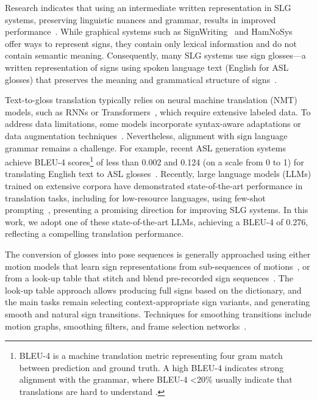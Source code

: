 Research indicates that using an intermediate written representation in SLG systems, preserving linguistic nuances and grammar, results in improved performance~\cite{hwang2024universal, ma2024multi, camgoz_neural_2018}. While graphical systems such as SignWriting~\cite{sutton1974signwriting} and HamNoSys~\cite{hanke2004hamnosys} offer ways to represent signs, they contain only lexical information and do not contain semantic meaning. Consequently, many SLG systems use sign glosses---a written representation of signs using spoken language text (\eg English for ASL glosses) that preserves the meaning and grammatical structure of signs~\cite{liddell2003grammar,desai2024systemic, bragg_sign_2019, muller_considerations_2023}. 

Text-to-gloss translation typically relies on neural machine translation (NMT) models, such as RNNs or Transformers~\cite{stoll_text2sign_2020, stoll2018sign, egea_gomez_syntax-aware_2021, saunders_progressive_2020, walsh_sign_2024, zhu_neural_2023, saunders2022signing}, which require extensive labeled data. To address data limitations, some models incorporate syntax-aware adaptations or data augmentation techniques~\cite{egea_gomez_syntax-aware_2021, zhu_neural_2023}. Nevertheless, alignment with sign language grammar remains a challenge. For example, recent ASL generation systems achieve BLEU-4 scores\footnote{ BLEU-4 is a machine translation metric representing four gram match between prediction and ground truth. A high BLEU-4 indicates strong alignment with the grammar, where BLEU-4 <20\% usually indicate that translations are hard to understand \cite{papineni_bleu_2002}.} of less than 0.002 and 0.124 (on a scale from 0 to 1) for translating English text to ASL glosses~\cite{inan2024generating,zhu_neural_2023}. Recently, large language models (LLMs) trained on extensive corpora have demonstrated state-of-the-art performance in translation tasks, including for low-resource languages, using few-shot prompting~\cite{brown2020language, hendy2023good, peng2023towards}, presenting a promising direction for improving SLG systems. In this work, we adopt one of these state-of-the-art LLMs, achieving a BLEU-4 of 0.276, reflecting a compelling translation performance.

The conversion of glosses into pose sequences is generally approached using either motion models that learn sign representations from sub-sequences of motions~\cite{saunders_progressive_2020, saunders2021mixed, xie2024g2p}, or from a look-up table that stitch and blend pre-recorded sign sequences~\cite{moryossef2023open, stoll_text2sign_2020, stoll2018sign, saunders2022signing, walsh_sign_2024}. The look-up table approach allows producing full signs based on the dictionary, and the main tasks remain selecting context-appropriate sign variants, and generating smooth and natural sign transitions. Techniques for smoothing transitions include motion graphs, smoothing filters, and frame selection networks~\cite{stoll_text2sign_2020, saunders2022signing, moryossef2023open, walsh_sign_2024}. 

